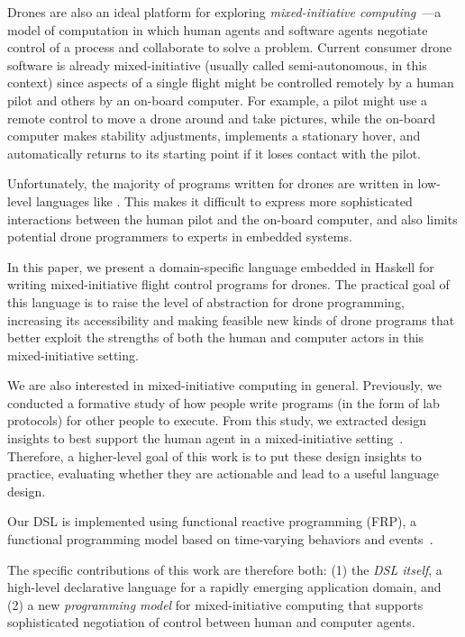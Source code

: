 \documentclass{sig-alternate-05-2015}
\begin{document}
Drones are also an ideal platform for exploring \emph{mixed-initiative
computing}~\cite{H99principles}---a model of computation in which human agents
and software agents negotiate control of a process and collaborate to solve a
problem.
%
Current consumer drone software is already mixed-initiative (usually called
semi-autonomous, in this context) since aspects of a single flight might be
controlled remotely by a human pilot and others by an on-board computer. For
example, a pilot might use a remote control to move a drone around and take
pictures, while the on-board computer makes stability adjustments, implements a
stationary hover, and automatically returns to its starting point if it loses
contact with the pilot.

Unfortunately, the majority of programs written for drones are written in
low-level languages like . This makes it difficult to express more
sophisticated interactions between the human pilot and the on-board computer,
and also limits potential drone programmers to experts in embedded systems.

In this paper, we present a domain-specific language embedded in Haskell for
writing mixed-initiative flight control programs for drones. The practical goal
of this language is to raise the level of abstraction for drone programming,
increasing its accessibility and making feasible new kinds of drone programs
that better exploit the strengths of both the human and computer actors in this
mixed-initiative setting.

We are also interested in mixed-initiative computing in general. Previously, we
conducted a formative study of how people write programs (in the form of lab
protocols) for other people to execute. From this study, we extracted design
insights to best support the human agent in a mixed-initiative
setting~\cite{ABW15prog}.
%
Therefore, a higher-level goal of this work is to put these design insights to
practice, evaluating whether they are actionable and lead to a useful language
design.

Our DSL is implemented using functional reactive programming (FRP), a
functional programming model based on time-varying behaviors and
events~\cite{EH97fra,WH00frp}.

The specific contributions of this work are therefore both: (1) the \emph{DSL
itself}, a high-level declarative language for a rapidly emerging application
domain, and (2) a new \emph{programming model} for mixed-initiative computing
that supports sophisticated negotiation of control between human and computer
agents.
\end{document}
